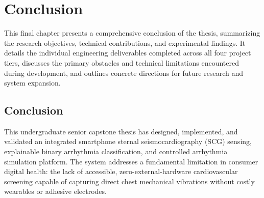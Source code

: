 \chapter{Conclusion}

This final chapter presents a comprehensive conclusion of the thesis, summarizing the research objectives, technical contributions, and experimental findings. It details the individual engineering deliverables completed across all four project tiers, discusses the primary obstacles and technical limitations encountered during development, and outlines concrete directions for future research and system expansion.

\section{Conclusion}

This undergraduate senior capstone thesis has designed, implemented, and validated an integrated smartphone sternal seismocardiography (SCG) sensing, explainable binary arrhythmia classification, and controlled arrhythmia simulation platform. The system addresses a fundamental limitation in consumer digital health: the lack of accessible, zero-external-hardware cardiovascular screening capable of capturing direct chest mechanical vibrations without costly wearables or adhesive electrodes.

